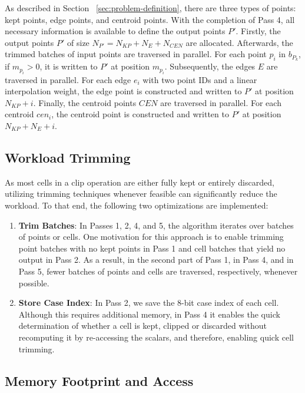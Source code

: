 \documentclass{egpubl}
\begin{document}
As described in Section ~\ref{sec:problem-definition}, there are three types of points: kept points, edge points, and centroid points. With the completion of Pass 4, all necessary information is available to define the output points $P'$. Firstly, the output points $P'$ of size $N_{P'} = N_{KP} + N_E + N_{CEN}$ are allocated. Afterwards, the trimmed batches of input points are traversed in parallel. For each point $p_i$ in $b_{P_k}$, if $m_{p_{i}} > 0$, it is written to $P'$ at position $m_{p_{i}}$. Subsequently, the edges $E$ are traversed in parallel. For each edge $e_i$ with two point IDs and a linear interpolation weight, the edge point is constructed and written to $P'$ at position $N_{KP} + i$. Finally, the centroid points $CEN$ are traversed in parallel. For each centroid $cen_i$, the centroid point is constructed and written to $P'$ at position $N_{KP} + N_E + i$.

\subsection{Workload Trimming}
\label{sec:workload-trimming}

As most cells in a clip operation are either fully kept or entirely discarded, utilizing trimming techniques whenever feasible can significantly reduce the workload. To that end, the following two optimizations are implemented:

\begin{enumerate}
    \item \textbf{Trim Batches}: In Passes 1, 2, 4, and 5, the algorithm iterates over batches of points or cells. One motivation for this approach is to enable trimming point batches with no kept points in Pass 1 and cell batches that yield no output in Pass 2. As a result, in the second part of Pass 1, in Pass 4, and in Pass 5, fewer batches of points and cells are traversed, respectively, whenever possible.
    \item \textbf{Store Case Index}: In Pass 2, we save the 8-bit case index of each cell. Although this requires additional memory, in Pass 4 it enables the quick determination of whether a cell is kept, clipped or discarded without recomputing it by re-accessing the scalars, and therefore, enabling quick cell trimming.
\end{enumerate}

\subsection{Memory Footprint and Access}
\label{sec:memory-footprint-and-access}
\end{document}
